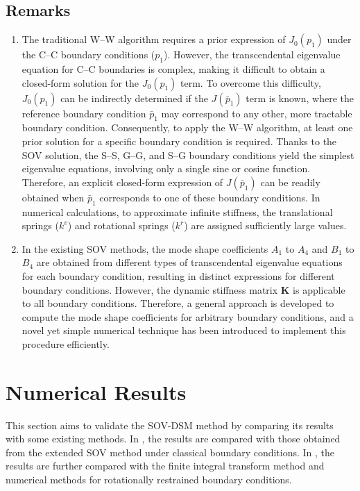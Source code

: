 \documentclass[preprint,12pt,number]{elsarticle}
\providecommand{\DIFaddtex}[1]{{\protect\color{blue}\uwave{#1}}} %
\providecommand{\DIFdeltex}[1]{{\protect\color{red}\sout{#1}}}                      %
\providecommand{\DIFaddbegin}{} %
\providecommand{\DIFaddend}{} %
\providecommand{\DIFdelbegin}{} %
\providecommand{\DIFdelend}{} %
\providecommand{\DIFadd}[1]{\texorpdfstring{\DIFaddtex{#1}}{#1}} %
\providecommand{\DIFdel}[1]{\texorpdfstring{\DIFdeltex{#1}}{}} %
\newcommand{\DIFscaledelfig}{0.5}
\newlength{\DIFdelgraphicswidth} %
\newlength{\DIFdelgraphicsheight} %
\newcommand{\DIFaddincludegraphics}[2][]{{\color{blue}\fbox{\DIFOincludegraphics[#1]{#2}}}} %
\newcommand{\DIFdelincludegraphics}[2][]{%
\sbox{\DIFdelgraphicsbox}{\DIFOincludegraphics[#1]{#2}}%
\settoboxwidth{\DIFdelgraphicswidth}{\DIFdelgraphicsbox} %
\settoboxtotalheight{\DIFdelgraphicsheight}{\DIFdelgraphicsbox} %
\scalebox{\DIFscaledelfig}{%
\parbox[b]{\DIFdelgraphicswidth}{\usebox{\DIFdelgraphicsbox}\\[-\baselineskip] \rule{\DIFdelgraphicswidth}{0em}}\llap{\resizebox{\DIFdelgraphicswidth}{\DIFdelgraphicsheight}{%
\setlength{\unitlength}{\DIFdelgraphicswidth}%
\begin{picture}(1,1)%
\thicklines\linethickness{2pt} %
{\color[rgb]{1,0,0}\put(0,0){\framebox(1,1){}}}%
{\color[rgb]{1,0,0}\put(0,0){\line( 1,1){1}}}%
{\color[rgb]{1,0,0}\put(0,1){\line(1,-1){1}}}%
\end{picture}%
}\hspace*{3pt}}} %
} %
\DeclareRobustCommand{\DIFaddbegin}{\DIFOaddbegin \let\includegraphics\DIFaddincludegraphics} %
\DeclareRobustCommand{\DIFaddend}{\DIFOaddend \let\includegraphics\DIFOincludegraphics} %
\DeclareRobustCommand{\DIFdelbegin}{\DIFOdelbegin \let\includegraphics\DIFdelincludegraphics} %
\DeclareRobustCommand{\DIFdelend}{\DIFOaddend \let\includegraphics\DIFOincludegraphics} %
\begin{document}
\subsection{Remarks}
\begin{enumerate}[label=(\roman*)]
	\item The traditional W–W algorithm requires a prior expression of $J_0(p_1)$ under the C–C boundary conditions ($p_1$).  
	However, the transcendental eigenvalue equation for C–C boundaries is complex, making it difficult to obtain a closed-form solution for the $J_0(p_1)$ term.  
	To overcome this difficulty, $J_0(p_1)$ can be indirectly determined if the $J(\bar{p}_1)$ term is known,  
	where the reference boundary condition $\bar{p}_1$ may correspond to any other, more tractable boundary condition.  
	Consequently, to apply the W–W algorithm, at least one prior solution for a specific boundary condition is required.  	
	Thanks to the SOV solution, the S–S, G–G, and S–G boundary conditions yield the simplest eigenvalue equations, involving only a single sine or cosine function.  
	Therefore, an explicit closed-form expression of $J(\bar{p}_1)$ can be readily obtained when $\bar{p}_1$ corresponds to one of these boundary conditions.  	
	In numerical calculations, to approximate infinite stiffness, the translational springs (\DIFdelbegin \DIFdel{$k^v$}\DIFdelend \DIFaddbegin \DIFadd{$k^{v}_{\xi}$,$k^{v}_{\eta}$}\DIFaddend ) and rotational springs (\DIFdelbegin \DIFdel{$k^r$}\DIFdelend \DIFaddbegin \DIFadd{$k^{r}_{\xi}$,$k^{r}_{\eta}$}\DIFaddend ) are assigned sufficiently large values.

	\item In the existing SOV methods, the mode shape coefficients $A_1$ to $A_4$ and $B_1$ to $B_4$ are obtained from different types of transcendental eigenvalue equations for each boundary condition, resulting in distinct expressions for different boundary conditions.  
	However, the dynamic stiffness matrix $\mathbf{K}$ is applicable to all boundary conditions.  
	Therefore, a general approach is developed to compute the mode shape coefficients for arbitrary boundary conditions,  
	and a novel yet simple numerical technique has been introduced to implement this procedure efficiently.

	
\end{enumerate}


\FloatBarrier
\section{Numerical Results}\label{sec:NR}  
This section aims to validate the SOV-DSM method by comparing its results with some existing methods.  
In , the results are compared with those obtained from the extended SOV method under classical boundary conditions.  
In , the results are further compared with the finite integral transform method and numerical methods for rotationally restrained boundary conditions.
\end{document}
